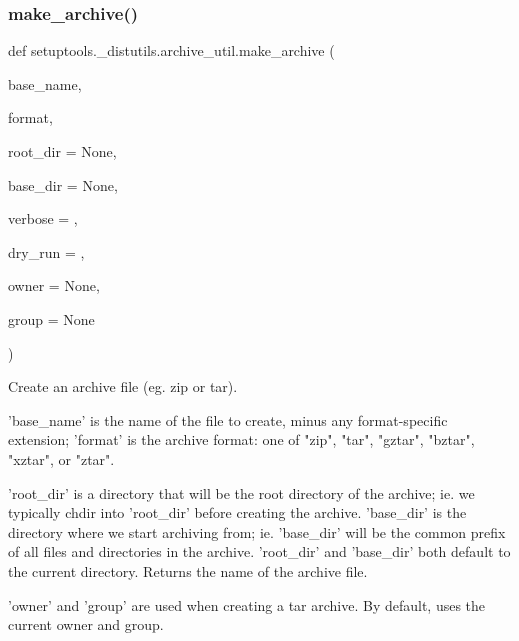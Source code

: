 \subsubsection{\texorpdfstring{make\+\_\+archive()}{make\_archive()}}
{\footnotesize\ttfamily def setuptools.\+\_\+distutils.\+archive\+\_\+util.\+make\+\_\+archive (\begin{DoxyParamCaption}\item[{}]{base\+\_\+name,  }\item[{}]{format,  }\item[{}]{root\+\_\+dir = {\ttfamily None},  }\item[{}]{base\+\_\+dir = {\ttfamily None},  }\item[{}]{verbose = {},  }\item[{}]{dry\+\_\+run = {},  }\item[{}]{owner = {\ttfamily None},  }\item[{}]{group = {\ttfamily None} }\end{DoxyParamCaption})}

\begin{DoxyVerb}Create an archive file (eg. zip or tar).

'base_name' is the name of the file to create, minus any format-specific
extension; 'format' is the archive format: one of "zip", "tar", "gztar",
"bztar", "xztar", or "ztar".

'root_dir' is a directory that will be the root directory of the
archive; ie. we typically chdir into 'root_dir' before creating the
archive.  'base_dir' is the directory where we start archiving from;
ie. 'base_dir' will be the common prefix of all files and
directories in the archive.  'root_dir' and 'base_dir' both default
to the current directory.  Returns the name of the archive file.

'owner' and 'group' are used when creating a tar archive. By default,
uses the current owner and group.
\end{DoxyVerb}
 \mbox{\label{namespacesetuptools_1_1__distutils_1_1archive__util_a3274d5b3e116dba9c44cdf5d0a0713dc}} 
